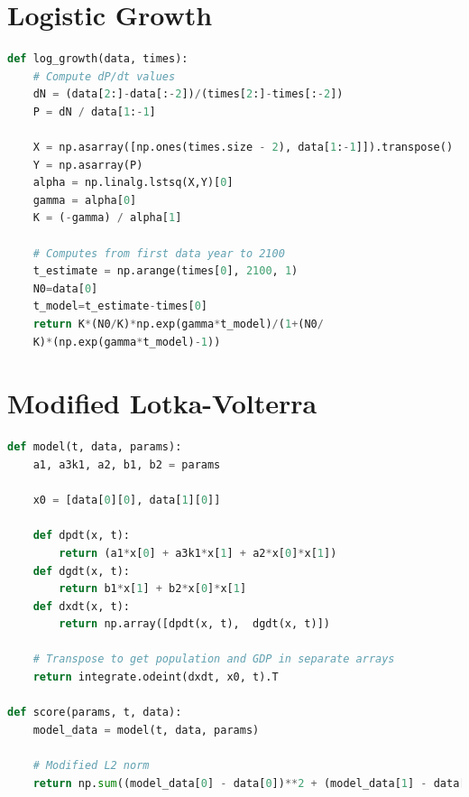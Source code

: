 \documentclass[a4paper]{article}
\begin{document}
\begin{appendices}

\section{Logistic Growth}

\begin{lstlisting}[language=Python]
def log_growth(data, times):
    # Compute dP/dt values
    dN = (data[2:]-data[:-2])/(times[2:]-times[:-2])
    P = dN / data[1:-1]
    
    X = np.asarray([np.ones(times.size - 2), data[1:-1]]).transpose()
    Y = np.asarray(P)
    alpha = np.linalg.lstsq(X,Y)[0]
    gamma = alpha[0]
    K = (-gamma) / alpha[1]
   
    # Computes from first data year to 2100
    t_estimate = np.arange(times[0], 2100, 1)
    N0=data[0]
    t_model=t_estimate-times[0]
    return K*(N0/K)*np.exp(gamma*t_model)/(1+(N0/
    K)*(np.exp(gamma*t_model)-1))
\end{lstlisting}

\section{Modified Lotka-Volterra}

\begin{lstlisting}[language=Python]
def model(t, data, params):   
    a1, a3k1, a2, b1, b2 = params
    
    x0 = [data[0][0], data[1][0]]
    
    def dpdt(x, t):
        return (a1*x[0] + a3k1*x[1] + a2*x[0]*x[1])
    def dgdt(x, t):
        return b1*x[1] + b2*x[0]*x[1]
    def dxdt(x, t):
        return np.array([dpdt(x, t),  dgdt(x, t)])
    
    # Transpose to get population and GDP in separate arrays
    return integrate.odeint(dxdt, x0, t).T 

def score(params, t, data):
    model_data = model(t, data, params)
    
    # Modified L2 norm
    return np.sum((model_data[0] - data[0])**2 + (model_data[1] - data[1])**2) 
\end{lstlisting}

\end{appendices}

\newpage

\nocite{*}


\end{document}
